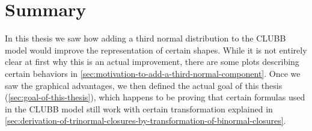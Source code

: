 \chapter{Summary}\label{ch:summary}

In this thesis we saw how adding a third normal distribution to the \gls{CLUBB} model
would improve the representation of certain shapes.
While it is not entirely clear at first why this is an actual improvement,
there are some plots describing certain behaviors in \cref{sec:motivation-to-add-a-third-normal-component}.
Once we saw the graphical advantages,
we then defined the actual goal of this thesis (\cref{sec:goal-of-this-thesis}),
which happens to be
proving that certain formulas used in the \gls{CLUBB} model still work
with certain transformation explained in \cref{sec:derivation-of-trinormal-closures-by-transformation-of-binormal-closures}.